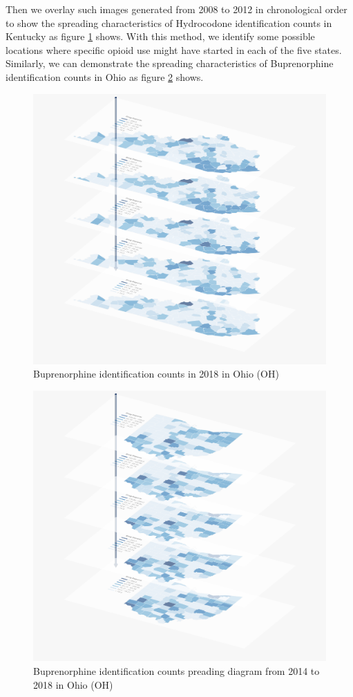 \documentclass{mcmthesis}
\begin{document}
Then we overlay such images generated from 2008 to 2012 in chronological order to show the spreading characteristics of Hydrocodone identification counts in Kentucky as figure \ref{KY_Hydrocodone} shows. With this method, we identify some  possible locations where specific opioid use might have started in each of the five states. Similarly, we can demonstrate the spreading characteristics of Buprenorphine identification counts in Ohio as figure \ref{OH_Buprenorphine} shows.

\begin{figure}[htbp]
	\centering 
	\includegraphics[width=0.7\linewidth]{../figure/KY_Hydrocodone} 
	\caption{Buprenorphine identification counts in 2018 in Ohio (OH)} 
	\label{KY_Hydrocodone}  
\end{figure}



\begin{figure}[htbp]
	\centering 
	\includegraphics[width=0.7\linewidth]{../figure/OH_Buprenorphine} 
	\caption{Buprenorphine identification counts preading diagram from 2014 to 2018 in Ohio (OH)} 
	\label{OH_Buprenorphine}  
\end{figure}
\end{document}
